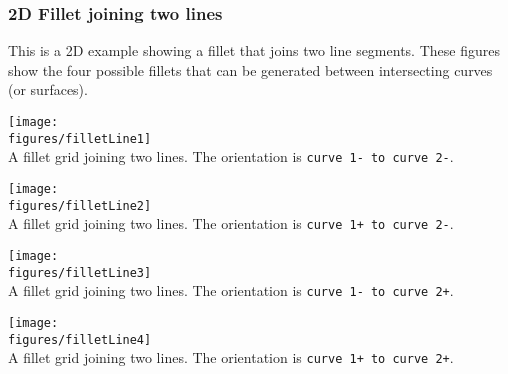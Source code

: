 \subsubsection{2D Fillet joining two lines}

This is a 2D example showing a fillet that joins two line segments.
These figures show the four possible fillets that can be generated between intersecting curves 
(or surfaces).


\noindent
\begin{minipage}{.45\linewidth}
  \begin{center}
   \texttt{[image: \\figures/filletLine1]} \\
  {A fillet grid joining two lines. The orientation is {\tt curve 1- to curve 2-}.}
  \end{center}
\end{minipage}\hfill
\begin{minipage}{.45\linewidth}
  \begin{center}
   \texttt{[image: \\figures/filletLine2]} \\
  {A fillet grid joining two lines. The orientation is {\tt curve 1+ to curve 2-}.}
  \end{center}
\end{minipage}

\noindent
\begin{minipage}{.45\linewidth}
  \begin{center}
   \texttt{[image: \\figures/filletLine3]} \\
  {A fillet grid joining two lines. The orientation is {\tt curve 1- to curve 2+}.}
  \end{center}
\end{minipage}\hfill
\begin{minipage}{.45\linewidth}
  \begin{center}
   \texttt{[image: \\figures/filletLine4]} \\
  {A fillet grid joining two lines. The orientation is {\tt curve 1+ to curve 2+}.}
  \end{center}
\end{minipage}



